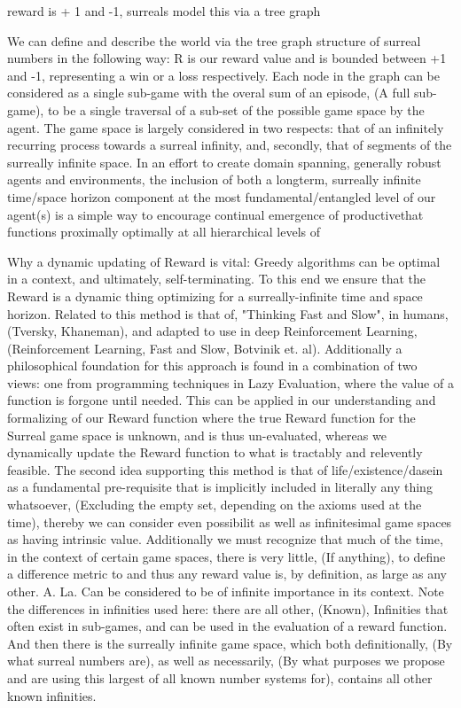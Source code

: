 \documentclass{article}
\begin{document}
reward is + 1 and -1, surreals model this via a tree graph

We can define and describe the world via the tree graph structure of surreal numbers in the following way: R is our reward value and is bounded between +1 and -1, representing a win or a loss respectively. Each node in the graph can be considered as a single sub-game with the overal sum of an episode, (A full sub-game), to be a single traversal of a sub-set of the possible game space by the agent. The game space is largely considered in two respects: that of an infinitely recurring process towards a surreal infinity, and, secondly, that of segments of the surreally infinite space. In an effort to create domain spanning, generally robust agents and environments, the inclusion of both a longterm, surreally infinite time/space horizon component at the most fundamental/entangled level of our agent(s) is a simple way to encourage continual emergence of productivethat functions proximally optimally at all hierarchical levels of 

Why a dynamic updating of Reward is vital: Greedy algorithms can be optimal in a context, and ultimately, self-terminating. To this end we ensure that the Reward is a dynamic thing optimizing for a surreally-infinite time and space horizon. Related to this method is that of, "Thinking Fast and Slow", in humans, (Tversky, Khaneman), and adapted to use in deep Reinforcement Learning, (Reinforcement Learning, Fast and Slow, Botvinik et. al). Additionally a philosophical foundation for this approach is found in a combination of two views: one from programming techniques in Lazy Evaluation, where the value of a function is forgone until needed. This can be applied in our understanding and formalizing of our Reward function where the true Reward function for the Surreal game space is unknown, and is thus un-evaluated, whereas we dynamically update the Reward function to what is tractably and relevently feasible. The second idea supporting this method is that of life/existence/dasein as a fundamental pre-requisite that is implicitly included in literally any thing whatsoever, (Excluding the empty set, depending on the axioms used at the time), thereby we can consider even possibilit as well as infinitesimal game spaces as having intrinsic value. Additionally we must recognize that much of the time, in the context of certain game spaces, there is very little, (If anything), to define a difference metric to and thus any reward value is, by definition, as large as any other. A. La. Can be considered to be of infinite importance in its context. Note the differences in infinities used here: there are all other, (Known), Infinities that often exist in sub-games, and can be used in the evaluation of a reward function. And then there is the surreally infinite game space, which both definitionally, (By what surreal numbers are), as well as necessarily, (By what purposes we propose and are using this largest of all known number systems for), contains all other known infinities. 
\end{document}
